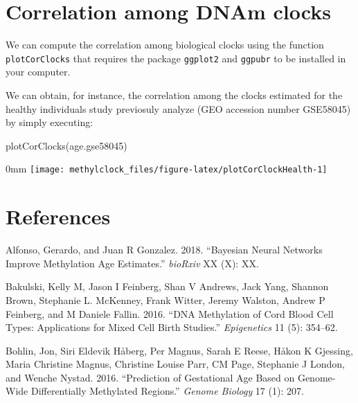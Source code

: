 \documentclass[]{article}
\newcommand{\hlstd}[1]{\textcolor[rgb]{0.251,0.251,0.251}{#1}}%
\newcommand{\hlkwd}[1]{\textcolor[rgb]{0.878,0.439,0.125}{#1}}%
\newenvironment{Shaded}{\begin{myshaded}}{\end{myshaded}}
\newcommand{\KeywordTok}[1]{\hlkwd{#1}}
\newcommand{\NormalTok}[1]{\hlstd{#1}}
\begin{document}
\hypertarget{correlation-among-dnam-clocks}{%
\section{Correlation among DNAm clocks}\label{correlation-among-dnam-clocks}}

We can compute the correlation among biological clocks using the function \texttt{plotCorClocks} that requires the package \texttt{ggplot2} and \texttt{ggpubr} to be installed in your computer.

We can obtain, for instance, the correlation among the clocks estimated for the healthy individuals study previosuly analyze (GEO accession number GSE58045) by simply executing:

\begin{Shaded}
\begin{Highlighting}[]
\KeywordTok{plotCorClocks}\NormalTok{(age.gse58045)}
\end{Highlighting}
\end{Shaded}

\begin{adjustwidth}{\fltoffset}{0mm}
\texttt{[image: methylclock\_files/figure-latex/plotCorClockHealth-1]} \end{adjustwidth}

\hypertarget{references}{%
\section*{References}\label{references}}

\hypertarget{refs}{}
\leavevmode\hypertarget{ref-alfonso2018}{}%
Alfonso, Gerardo, and Juan R Gonzalez. 2018. ``Bayesian Neural Networks Improve Methylation Age Estimates.'' \emph{bioRxiv} XX (X): XX.

\leavevmode\hypertarget{ref-bakulski2016dna}{}%
Bakulski, Kelly M, Jason I Feinberg, Shan V Andrews, Jack Yang, Shannon Brown, Stephanie L. McKenney, Frank Witter, Jeremy Walston, Andrew P Feinberg, and M Daniele Fallin. 2016. ``DNA Methylation of Cord Blood Cell Types: Applications for Mixed Cell Birth Studies.'' \emph{Epigenetics} 11 (5): 354--62.

\leavevmode\hypertarget{ref-bohlin2016prediction}{}%
Bohlin, Jon, Siri Eldevik Håberg, Per Magnus, Sarah E Reese, Håkon K Gjessing, Maria Christine Magnus, Christine Louise Parr, CM Page, Stephanie J London, and Wenche Nystad. 2016. ``Prediction of Gestational Age Based on Genome-Wide Differentially Methylated Regions.'' \emph{Genome Biology} 17 (1): 207.
\end{document}
